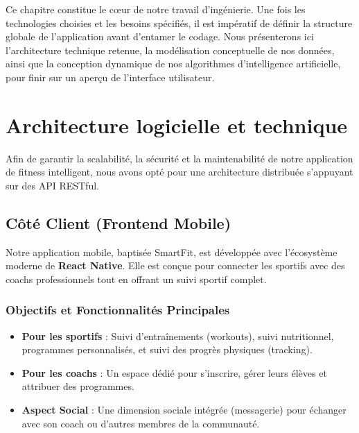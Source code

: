 Ce chapitre constitue le cœur de notre travail d'ingénierie. Une fois les technologies choisies et les besoins spécifiés, il est impératif de définir la structure globale de l'application avant d'entamer le codage. Nous présenterons ici l'architecture technique retenue, la modélisation conceptuelle de nos données, ainsi que la conception dynamique de nos algorithmes d'intelligence artificielle, pour finir sur un aperçu de l'interface utilisateur.

\section{Architecture logicielle et technique}
Afin de garantir la scalabilité, la sécurité et la maintenabilité de notre application de fitness intelligent, nous avons opté pour une architecture distribuée s'appuyant sur des API RESTful.

\subsection{Côté Client (Frontend Mobile)}
Notre application mobile, baptisée SmartFit, est développée avec l'écosystème moderne de \textbf{React Native}. Elle est conçue pour connecter les sportifs avec des coachs professionnels tout en offrant un suivi sportif complet.

\subsubsection{Objectifs et Fonctionnalités Principales}
\begin{itemize}
    \item \textbf{Pour les sportifs} : Suivi d'entraînements (workouts), suivi nutritionnel, programmes personnalisés, et suivi des progrès physiques (tracking).
    \item \textbf{Pour les coachs} : Un espace dédié pour s'inscrire, gérer leurs élèves et attribuer des programmes.
    \item \textbf{Aspect Social} : Une dimension sociale intégrée (messagerie) pour échanger avec son coach ou d'autres membres de la communauté.
\end{itemize}

